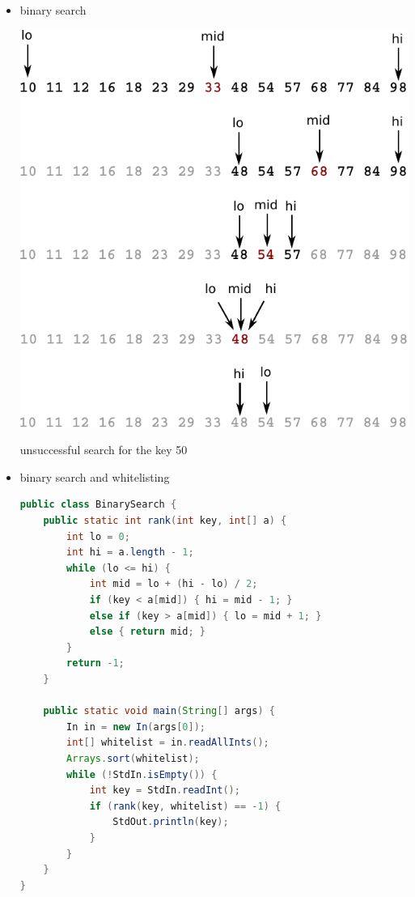 \documentclass[8pt,a4paper,compress]{beamer}
\begin{document}
\begin{frame}[fragile]
\begin{itemize}
\item binary search
\begin{center}
\includegraphics[scale=0.65]{./figures/bs2.pdf}

\smallskip

unsuccessful search for the key 50
\end{center}
\end{itemize}
\end{frame}

\begin{frame}[fragile]
\begin{itemize}
\item binary search and whitelisting
\begin{lstlisting}[language=Java]
public class BinarySearch {
    public static int rank(int key, int[] a) {
        int lo = 0;
        int hi = a.length - 1;
        while (lo <= hi) {
            int mid = lo + (hi - lo) / 2;
            if (key < a[mid]) { hi = mid - 1; }
            else if (key > a[mid]) { lo = mid + 1; }
            else { return mid; }
        }
        return -1;
    }

    public static void main(String[] args) {
        In in = new In(args[0]);
        int[] whitelist = in.readAllInts();
        Arrays.sort(whitelist);
        while (!StdIn.isEmpty()) {
            int key = StdIn.readInt();
            if (rank(key, whitelist) == -1) {
                StdOut.println(key);
            }
        }
    }
}
\end{lstlisting}
\end{itemize}
\end{frame}
\end{document}
